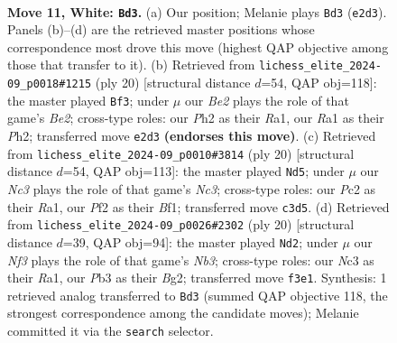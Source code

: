 \documentclass[11pt]{article}
\begin{document}
\clearpage

\begin{figure}[p]\centering
\begin{subfigure}{0.46\textwidth}\centering
\resizebox{\linewidth}{!}{%
\newchessgame
\chessboard[
  setfen={rnbq1rk1/1p2bppp/p2p1n2/4p3/P3P3/1PN2N2/2P1BPPP/R1BQ1RK1 w - - 1 11},
  showmover=false,
  pgfstyle=straightmove, color=movearrow, markmove={e2-d3}
]}
\caption{}
\end{subfigure}\hfill
\begin{subfigure}{0.46\textwidth}\centering
\resizebox{\linewidth}{!}{%
\newchessgame
\chessboard[
  setfen={r1bq1rk1/1p2ppbp/3p1np1/p7/Pn2PP2/1NN5/1PP1B1PP/R1BQ1RK1 w - - 1 11},
  showmover=false,
  pgfstyle=straightmove, color=movearrow, markmove={e2-f3}
]}
\caption{}
\end{subfigure}
\\[4pt]
\begin{subfigure}{0.46\textwidth}\centering
\resizebox{\linewidth}{!}{%
\newchessgame
\chessboard[
  setfen={r2q1rk1/pp2bpp1/2npbn1p/4p3/4P3/2N2N2/PPP2PPP/R1BQRBK1 w - - 2 11},
  showmover=false,
  pgfstyle=straightmove, color=movearrow, markmove={c3-d5}
]}
\caption{}
\end{subfigure}\hfill
\begin{subfigure}{0.46\textwidth}\centering
\resizebox{\linewidth}{!}{%
\newchessgame
\chessboard[
  setfen={rn1q1rk1/1b2bppp/p2p1n2/1p2p3/4P3/1NN3P1/PPP2PBP/R1BQR1K1 w - - 2 11},
  showmover=false,
  pgfstyle=straightmove, color=movearrow, markmove={b3-d2}
]}
\caption{}
\end{subfigure}
\caption{\textbf{Move 11, White: \texttt{Bd3}.} (a) Our position; Melanie plays \texttt{Bd3} (\texttt{e2d3}). Panels (b)--(d) are the retrieved master positions whose correspondence most drove this move (highest QAP objective among those that transfer to it). (b) Retrieved from \texttt{lichess\_elite\_2024-09\_p0018\#1215} (ply 20) [structural distance $d$=54, QAP obj=118]: the master played \texttt{Bf3}; under $\mu$ our \emph{Be2} plays the role of that game's \emph{Be2}; cross-type roles: our \emph{P}h2 as their \emph{R}a1, our \emph{R}a1 as their \emph{P}h2; transferred move \texttt{e2d3} \textbf{(endorses this move)}. (c) Retrieved from \texttt{lichess\_elite\_2024-09\_p0010\#3814} (ply 20) [structural distance $d$=54, QAP obj=113]: the master played \texttt{Nd5}; under $\mu$ our \emph{Nc3} plays the role of that game's \emph{Nc3}; cross-type roles: our \emph{P}c2 as their \emph{R}a1, our \emph{P}f2 as their \emph{B}f1; transferred move \texttt{c3d5}. (d) Retrieved from \texttt{lichess\_elite\_2024-09\_p0026\#2302} (ply 20) [structural distance $d$=39, QAP obj=94]: the master played \texttt{Nd2}; under $\mu$ our \emph{Nf3} plays the role of that game's \emph{Nb3}; cross-type roles: our \emph{N}c3 as their \emph{R}a1, our \emph{P}b3 as their \emph{B}g2; transferred move \texttt{f3e1}. Synthesis: 1 retrieved analog transferred to \texttt{Bd3} (summed QAP objective 118, the strongest correspondence among the candidate moves); Melanie committed it via the \texttt{search} selector.}
\label{fig:thought-m20}
\end{figure}
\end{document}
